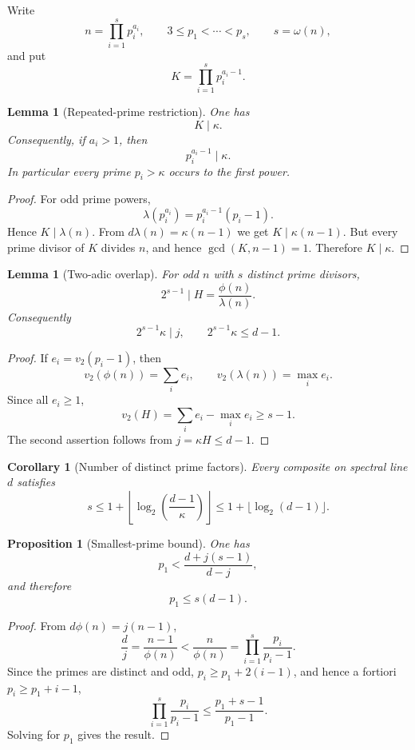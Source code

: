 \documentclass[11pt]{article}
\newtheorem{proposition}[theorem]{Proposition}
\newtheorem{lemma}[theorem]{Lemma}
\newtheorem{corollary}[theorem]{Corollary}
\begin{document}
Write
\[
n=\prod_{i=1}^s p_i^{a_i},
\qquad
3\le p_1<\cdots<p_s,
\qquad
s=\omega(n),
\]
and put
\[
K=\prod_{i=1}^s p_i^{a_i-1}.
\]

\begin{lemma}[Repeated-prime restriction]
\label{lem:Kdivd}
One has
\[
K\mid \kappa.
\]
Consequently, if $a_i>1$, then
\[
p_i^{a_i-1}\mid \kappa.
\]
In particular every prime $p_i>\kappa$ occurs to the first power.
\end{lemma}

\begin{proof}
For odd prime powers,
\[
\lambda(p_i^{a_i})=p_i^{a_i-1}(p_i-1).
\]
Hence $K\mid\lambda(n)$.  From
$d\lambda(n)=\kappa(n-1)$ we get $K\mid \kappa(n-1)$.
But every prime divisor of $K$ divides $n$, and hence
$\gcd(K,n-1)=1$.  Therefore $K\mid \kappa$.
\end{proof}

\begin{lemma}[Two-adic overlap]
\label{lem:H2adic}
For odd $n$ with $s$ distinct prime divisors,
\[
2^{s-1}\mid H=\frac{\phi(n)}{\lambda(n)}.
\]
Consequently
\begin{equation}
2^{s-1}\kappa\mid j,
\qquad
2^{s-1}\kappa\le d-1.
\label{eq:sd-bound}
\end{equation}
\end{lemma}

\begin{proof}
If $e_i=v_2(p_i-1)$, then
\[
v_2(\phi(n))=\sum_i e_i,
\qquad
v_2(\lambda(n))=\max_i e_i.
\]
Since all $e_i\ge1$,
\[
v_2(H)
=
\sum_i e_i-\max_i e_i
\ge s-1.
\]
The second assertion follows from $j=\kappa H\le d-1$.
\end{proof}

\begin{corollary}[Number of distinct prime factors]
\label{cor:sbound}
Every composite on spectral line $d$ satisfies
\[
s
\le
1+\left\lfloor
\log_2\!\left(\frac{d-1}{\kappa}\right)
\right\rfloor
\le
1+\lfloor\log_2(d-1)\rfloor.
\]
\end{corollary}

\begin{proposition}[Smallest-prime bound]
\label{prop:p1}
One has
\[
p_1<
\frac{d+j(s-1)}{d-j},
\]
and therefore
\[
p_1\le s(d-1).
\]
\end{proposition}

\begin{proof}
From $d\phi(n)=j(n-1)$,
\[
\frac dj
=
\frac{n-1}{\phi(n)}
<
\frac n{\phi(n)}
=
\prod_{i=1}^s\frac{p_i}{p_i-1}.
\]
Since the primes are distinct and odd, $p_i\ge p_1+2(i-1)$, and hence a fortiori $p_i\ge p_1+i-1$,
\[
\prod_{i=1}^s\frac{p_i}{p_i-1}
\le
\frac{p_1+s-1}{p_1-1}.
\]
Solving for $p_1$ gives the result.
\end{proof}
\end{document}
